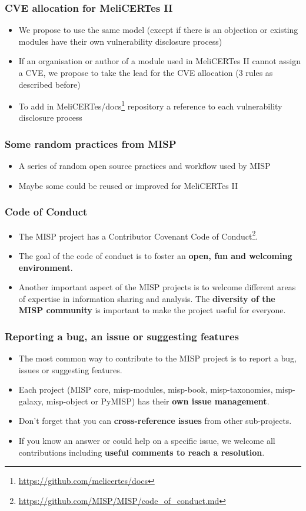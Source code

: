 \begin{frame}[fragile]
\frametitle{CVE allocation for MeliCERTes II}
\begin{itemize}
        \item We propose to use the same model (except if there is an objection or existing modules have their own vulnerability disclosure process)
        \item If an organisation or author of a module used in MeliCERTes II cannot assign a CVE, we propose to take the lead for the CVE allocation (3 rules as described before)
        \item To add in MeliCERTes/docs\footnote{\url{https://github.com/melicertes/docs}} repository a reference to each vulnerability disclosure process
\end{itemize}
\end{frame}


\begin{frame}
        \frametitle{Some random practices from MISP}
        \begin{itemize}
                \item A series of random open source practices and workflow used by MISP
                \item Maybe some could be reused or improved for MeliCERTes II
        \end{itemize}
\end{frame}



\begin{frame}[fragile]
\frametitle{Code of Conduct}
\begin{itemize}
\item The MISP project has a Contributor Covenant Code of Conduct\footnote{\url{https://github.com/MISP/MISP/code_of_conduct.md}}.
\item The goal of the code of conduct is to foster an {\bf open, fun and welcoming environment}.
\item Another important aspect of the MISP projects is to welcome different areas of expertise in information sharing and analysis. The {\bf diversity of the MISP community} is important to make the project useful for everyone.
\end{itemize}
\end{frame}

\begin{frame}[fragile]
\frametitle{Reporting a bug, an issue or suggesting features}
\begin{itemize}
\item The most common way to contribute to the MISP project is to report a bug, issues or suggesting features.
\item Each project (MISP core, misp-modules, misp-book, misp-taxonomies, misp-galaxy, misp-object or PyMISP) has their {\bf own issue management}.
\item Don't forget that you can {\bf cross-reference issues} from other sub-projects.
\item If you know an answer or could help on a specific issue, we welcome all contributions including {\bf useful comments to reach a resolution}.
\end{itemize}
\end{frame}


